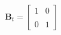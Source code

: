\documentclass[preview]{standalone}
\begin{document}
\begin{align*}
\mathbf{B}_t = \begin{bmatrix} 1 & 0 \\ \\0 & 1\end{bmatrix}
\end{align*}
\end{document}

